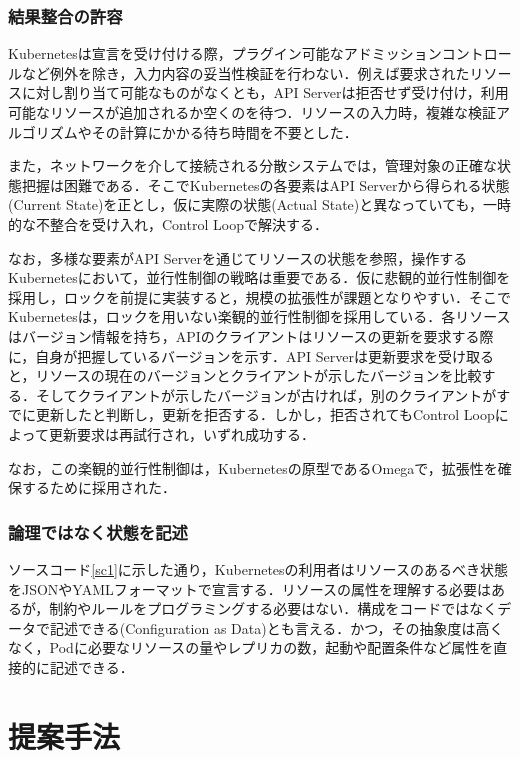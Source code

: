 \documentclass[12pt,a4j]{ujreport}
\begin{document}
\subsection{結果整合の許容}
Kubernetesは宣言を受け付ける際，プラグイン可能なアドミッションコントロールなど例外を除き，入力内容の妥当性検証を行わない．例えば要求されたリソースに対し割り当て可能なものがなくとも，API Serverは拒否せず受け付け，利用可能なリソースが追加されるか空くのを待つ．リソースの入力時，複雑な検証アルゴリズムやその計算にかかる待ち時間を不要とした．

また，ネットワークを介して接続される分散システムでは，管理対象の正確な状態把握は困難である．そこでKubernetesの各要素はAPI Serverから得られる状態(Current State)を正とし，仮に実際の状態(Actual State)と異なっていても，一時的な不整合を受け入れ，Control Loopで解決する\cite{ref23}．

なお，多様な要素がAPI Serverを通じてリソースの状態を参照，操作するKubernetesにおいて，並行性制御の戦略は重要である．仮に悲観的並行性制御を採用し，ロックを前提に実装すると，規模の拡張性が課題となりやすい．そこでKubernetesは，ロックを用いない楽観的並行性制御を採用している．各リソースはバージョン情報を持ち，APIのクライアントはリソースの更新を要求する際に，自身が把握しているバージョンを示す．API Serverは更新要求を受け取ると，リソースの現在のバージョンとクライアントが示したバージョンを比較する．そしてクライアントが示したバージョンが古ければ，別のクライアントがすでに更新したと判断し，更新を拒否する．しかし，拒否されてもControl Loopによって更新要求は再試行され，いずれ成功する．

なお，この楽観的並行性制御は，Kubernetesの原型であるOmegaで，拡張性を確保するために採用された\cite{ref24}．

\subsection{論理ではなく状態を記述}
ソースコード\ref{sc1}に示した通り，Kubernetesの利用者はリソースのあるべき状態をJSONやYAMLフォーマットで宣言する．リソースの属性を理解する必要はあるが，制約やルールをプログラミングする必要はない．構成をコードではなくデータで記述できる(Configuration as Data)\cite{ref25}とも言える．かつ，その抽象度は高くなく，Podに必要なリソースの量やレプリカの数，起動や配置条件など属性を直接的に記述できる．

\chapter{提案手法}
\end{document}
